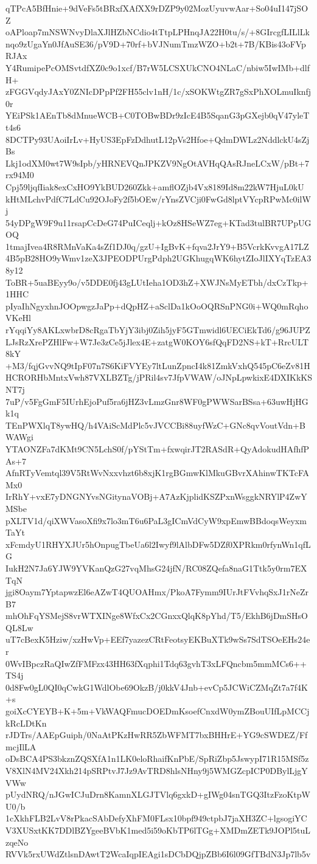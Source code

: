 qTPcA5BfHnie+9dVeFs5tBRxfXAfXX9rDZP9y02MozUyuvwAar+So04uI147jSOZ
oAPloap7mNSWNvyDlaXJlHZbNCdio4tTtpLPHnqJA22H0tu/s/+8GIrcgfLILlLk
nqo9zUgaYn0JfAuSE36/pV9D+70rf+bVJNumTmzWZO+b2t+7B/KBis43oFVpRJAx
Y4RumipePcOMSvtdfXZ0c9o1xcf/B7rW5LCSXUkCNO4NLaC/nbiw5IwIMb+dlfH+
zFGGVqdyJAxY0ZNIcDPpPf2FH55clv1nH/1c/xSOKWtgZR7gSxPhXOLmuIknfj0r
YEiPSk1AEnTb8dMnueWCB+C0TOBwBDr9zIcE4B5SqanG3pGXejb0qV47yleTt4s6
8DCTPy93UAoiIrLv+HyUS3EpFzDdhutL12pVs2Hfoe+QdmDWLz2NddlckU4sZjBs
Lkj1odXM0wt7W9sIpb/yHRNEVQnJPKZV9NgOtAVHqQAsRJneLCxW/pBt+7rx94M0
Cpj59ljqfIiak8exCxHO9YkBUD260Zkk+amflOZjb4Vx8189Id8m22kW7HjuL0kU
kHtMLchvPdfC7LdCu92OJoFy2f5bOEw/rYnsZVCji0FwGd8lptVYcpRPwMc0ilWj
54yDPgW9F9u11rsapCcDeG74PuICeqlj+kOz8HSeWZ7eg+KTad3tulBR7UPpUGOQ
1tmajIvea4R8RMnVaKa4sZf1DJ0q/gzU+IgBvK+fqva2JrY9+B5VcrkKvvgA17LZ
4B5pB28HO9yWmv1zeX3JPEODPUrgPdph2UGKhugqWK6hytZIoJlIXYqTzEA38y12
ToBR+5uaBEyy9o/v5DDE0fj43gLUtIeha1OD3hZ+XWJNsMyETbh/dxCzTkp+1HHC
pIyaIhNgyxhnJOOpwgzJaPp+dQpHZ+aSclDa1kOoOQRSnPNG0i+WQ0mRqhoVKeHl
rYqqiYy8AKLxwbrD8cRgaTbYjY3ibj0Zih5jyF5GTmwidl6UECiEkTd6/g96JUPZ
LJsRzXrePZHlFw+W7Je3zCe5jJlex4E+zatgW0KOY6sfQqFD2NS+kT+RrcULT8kY
+M3/fqjGvvNQ9tIpF07n7S6KiFVYEy7ltLunZpncI4k81ZmkVxhQ545pC6eZv81H
HCRORHbMntxVwh87VXLBZTg/jPRil4sv7JfpVWAW/oJNpLpwkixE4DXIKkKSNT7j
7uP/v5FgGmF5IUrhEjoPuf5ra6jHZ3vLmzGnr8WF0gPWWSarBSsa+63uwHjHGk1q
TEnPWXlqT8ywHQ/h4VAiScMdPlc5vJVCCBi88uyfWzC+GNc8qvVoutVdn+BWAWgi
YTAONZFa7dKMt9CN5LchS0f/pYStTm+fxwqirJT2RASdR+QyAdokudHAfhfPAs+7
AfnRTyVemtql39V5RtWvNxxvhzt6b8xjK1rgBGmwKlMkuGBvrXAhinwTKTcFAMx0
IrRhY+vxE7yDNGNYvsNGitynaVOBj+A7AzKjplidKSZPxnWsggkNRYlP4ZwYMSbe
pXLTV1d/qiXWVasoXfi9x7lo3mT6u6PaL3gICmVdCyW9xpEmwBBdoqsWeyxmTaYt
xFcmdyU1RHYXJUr5hOnpugTbeUa6l2Iwyf9lAlbDFw5DZf0XPRkm0rfynWn1qfLG
IukH2N7Ja6YJW9YVKanQzG27vqMhsG24jfN/RC08ZQefa8naG1Ttk5y0rm7EXTqN
jgi8Oaym7YptapwzEl6eAZwT4QUOAHmx/PkoA7Fymm9IUrJtFVvhqSxJ1rNeZrB7
mhOhFqYSMejS8vrWTXINge8WfxCx2CGnxxQlqK8pYhd/T5/EkhB6jDmSHsOQL8Lw
uT7cBexK5Hziw/xzHwVp+EEf7yazezCRtFeotsyEKBuXTk9wSs7SdTSOeEHs24er
0WvIBpczRaQIwZfFMFzx43HH63fXqphi1Tdq63gvhT3xLFQncbm5mmMCs6++TS4j
0d8Fw0gL0QI0qCwkG1WdlObe69OkzB/j0kkV4Jnb+evCp5JCWiCZMqZt7a7f4K+s
goiXcCYEYB+K+5m+VkWAQFmucDOEDmKsoefCnxdW0ymZBouUIfLpMCCjkRcLDtKn
rJDTrs/AAEpGuiph/0NaAtPKzHwRR5ZbWFMT7bxBHHrE+YG9cSWDEZ/FfmcjIlLA
oDsBCA4PS3bkznZQSXfA1n1LK0eloRhaifKnPbE/SpRiZbp5JswypI71R15MSf5z
V8XlN4MV24Xkh214pSRPtvJ7Jz9AvTRD8hlsNHny9j5WMGZcpICP0DBylLjgYVWw
pUydNRQ/nJGwICJuDrn8KamnXLGJTVlq6gxkD+gIWg04snTGQ3ItzFzoKtpWU0/b
1cXkhFLB2LvV8rPkacSAbDefyXhFM0FLsx10bpf949ctpbJ7jaXH3ZC+lgsogiYC
V3XUSxtKK7DDlBZYgeeBVbK1med5i59oKbTP6lTGg+XMDmZETk9JOPl5tuLzqeNo
RVVk5rxUWdZtlsnDAwtT2WcaIqpIEAgi1sDCbDQjpZBb6I6l09GfTBdN3Jp7lb5v
